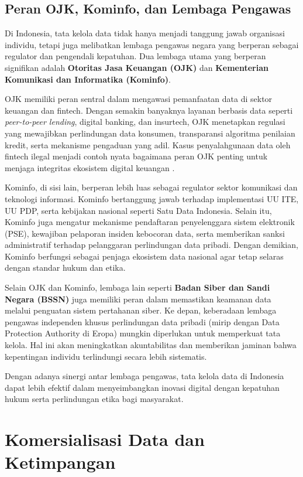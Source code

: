 \subsection{Peran OJK, Kominfo, dan Lembaga Pengawas}

Di Indonesia, tata kelola data tidak hanya menjadi tanggung jawab organisasi individu, tetapi juga melibatkan lembaga pengawas negara yang berperan sebagai regulator dan pengendali kepatuhan. Dua lembaga utama yang berperan signifikan adalah \textbf{Otoritas Jasa Keuangan (OJK)} dan \textbf{Kementerian Komunikasi dan Informatika (Kominfo)}.  

OJK memiliki peran sentral dalam mengawasi pemanfaatan data di sektor keuangan dan fintech. Dengan semakin banyaknya layanan berbasis data seperti \textit{peer-to-peer lending}, digital banking, dan insurtech, OJK menetapkan regulasi yang mewajibkan perlindungan data konsumen, transparansi algoritma penilaian kredit, serta mekanisme pengaduan yang adil. Kasus penyalahgunaan data oleh fintech ilegal menjadi contoh nyata bagaimana peran OJK penting untuk menjaga integritas ekosistem digital keuangan \cite{ojk2017}.  

Kominfo, di sisi lain, berperan lebih luas sebagai regulator sektor komunikasi dan teknologi informasi. Kominfo bertanggung jawab terhadap implementasi UU ITE, UU PDP, serta kebijakan nasional seperti Satu Data Indonesia. Selain itu, Kominfo juga mengatur mekanisme pendaftaran penyelenggara sistem elektronik (PSE), kewajiban pelaporan insiden kebocoran data, serta memberikan sanksi administratif terhadap pelanggaran perlindungan data pribadi. Dengan demikian, Kominfo berfungsi sebagai penjaga ekosistem data nasional agar tetap selaras dengan standar hukum dan etika.  

Selain OJK dan Kominfo, lembaga lain seperti \textbf{Badan Siber dan Sandi Negara (BSSN)} juga memiliki peran dalam memastikan keamanan data melalui penguatan sistem pertahanan siber. Ke depan, keberadaan lembaga pengawas independen khusus perlindungan data pribadi (mirip dengan Data Protection Authority di Eropa) mungkin diperlukan untuk memperkuat tata kelola. Hal ini akan meningkatkan akuntabilitas dan memberikan jaminan bahwa kepentingan individu terlindungi secara lebih sistematis.  

Dengan adanya sinergi antar lembaga pengawas, tata kelola data di Indonesia dapat lebih efektif dalam menyeimbangkan inovasi digital dengan kepatuhan hukum serta perlindungan etika bagi masyarakat.


\section{Komersialisasi Data dan Ketimpangan}

